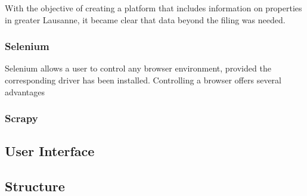 \documentclass[main]{subfiles}
\begin{document}
With the objective of creating a platform that includes information on properties in greater Lausanne, 
it became clear that data beyond the filing was needed.


\subsubsection{Selenium}
Selenium allows a user to control any browser environment, provided the corresponding driver has been installed.
Controlling a browser offers several advantages 

\subsubsection{Scrapy}




\subsection{User Interface}


\subsection{Structure}
\end{document}
